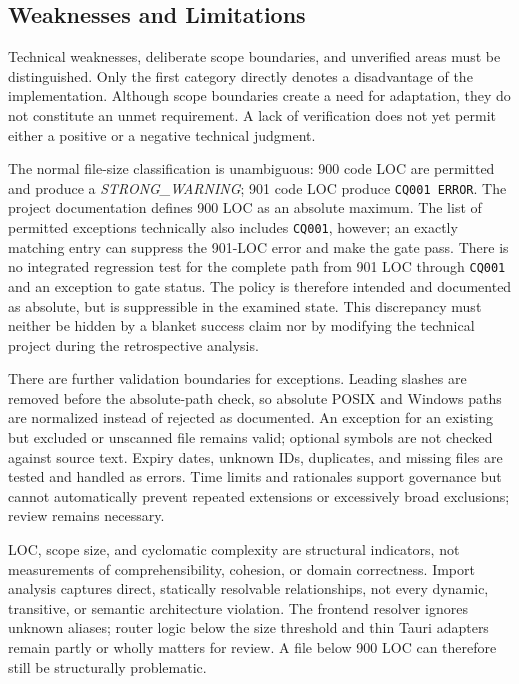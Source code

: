\subsection{Weaknesses and Limitations}
\label{subsec:schwaechen-grenzen}

Technical weaknesses, deliberate scope boundaries, and unverified areas must
be distinguished. Only the first category directly denotes a disadvantage of
the implementation.
Although scope boundaries create a need for adaptation, they do not constitute
an unmet requirement. A lack of verification does not yet permit either a
positive or a negative technical judgment.

The normal file-size classification is unambiguous: 900 code LOC are permitted
and produce a \emph{STRONG\_WARNING}; 901 code LOC produce
\texttt{CQ001 ERROR}. The project documentation defines 900 LOC as an absolute
maximum. The list of permitted exceptions technically also includes
\texttt{CQ001}, however; an exactly matching entry can suppress the 901-LOC
error and make the gate pass. There is no integrated regression test for the
complete path from 901 LOC through \texttt{CQ001} and an exception to gate
status. The policy is therefore intended and documented as absolute, but is
suppressible in the examined state. This discrepancy must neither be hidden by
a blanket success claim nor by modifying the technical project during the
retrospective analysis.

There are further validation boundaries for exceptions. Leading slashes are
removed before the absolute-path check, so absolute POSIX and Windows paths are
normalized instead of rejected as documented. An exception for an existing
but excluded or unscanned file remains valid; optional symbols are not checked
against source text. Expiry dates, unknown IDs, duplicates, and missing files
are tested and handled as errors. Time limits and rationales support
governance but cannot automatically prevent repeated extensions or excessively
broad exclusions; review remains necessary.

LOC, scope size, and cyclomatic complexity are structural indicators, not
measurements of comprehensibility, cohesion, or domain correctness. Import
analysis captures direct, statically resolvable relationships, not every
dynamic, transitive, or semantic architecture violation. The frontend resolver
ignores unknown aliases; router logic below the size threshold and thin Tauri
adapters remain partly or wholly matters for review. A file below 900 LOC can
therefore still be structurally problematic.

